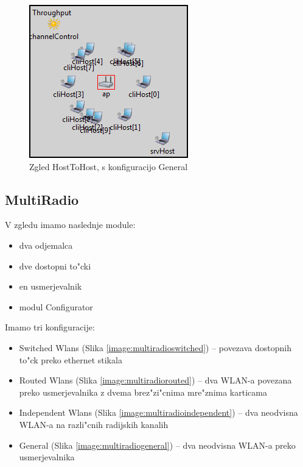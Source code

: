 \documentclass[a4paper,11pt]{article}
\begin{document}
\begin{figure}[htbp]
    \begin{center}
        \includegraphics[scale=0.8]{img/zgledi/hostohost_general.png}
        \caption{Zgled HostToHost, s konfiguracijo General}
        \label{image:hosttohostgeneral}
    \end{center}
\end{figure}


\subsection{MultiRadio}

V zgledu imamo naslednje module:

\begin{itemize}
    \item dva odjemalca
    \item dve dostopni to"cki
    \item en usmerjevalnik
    \item modul Configurator
\end{itemize}

Imamo tri konfiguracije:

\begin{itemize}
    \item Switched Wlans (Slika \ref{image:multiradioswitched}) – povezava dostopnih to"ck preko ethernet stikala
    \item Routed Wlans (Slika \ref{image:multiradiorouted}) – dva WLAN-a povezana preko usmerjevalnika z dvema brez"zi"cnima mre"znima karticama
    \item Independent Wlans (Slika \ref{image:multiradioindependent}) – dva neodvisna WLAN-a na razli"cnih radijskih kanalih
    \item General (Slika \ref{image:multiradiogeneral}) – dva neodvisna WLAN-a preko usmerjevalnika
\end{itemize}
\end{document}
